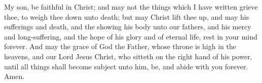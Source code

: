 \bverse \iffalse My son, be faithful in Christ; and may not the things which I have written grieve thee, to weigh thee down unto death; but may Christ lift thee up, and may his sufferings and death, and the showing his body unto our fathers, and his mercy and long-suffering, and the hope of his glory and of eternal life, rest in your mind forever. \fi
My son, be faithful in Christ; and may not the things which I have written grieve thee, to weigh thee down unto death; but may Christ lift thee up, and may his sufferings and death, and the showing his body unto our fathers, and his mercy and long-suffering, and the hope of his glory and of eternal life, rest in your mind forever.
\bverse \iffalse And may the grace of God the Father, whose throne is high in the heavens, and our Lord Jesus Christ, who sitteth on the right hand of his power, until all things shall become subject unto him, be, and abide with you forever. Amen. \fi
And may the grace of God the Father, whose throne is high in the heavens, and our Lord Jesus Christ, who sitteth on the right hand of his power, until all things shall become subject unto him, be, and abide with you forever. Amen.

